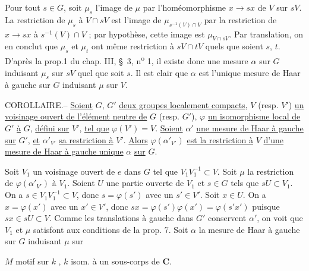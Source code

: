 Pour tout $s\in G$, soit $\mu_s$ l'image de $\mu$ par l'homéomorphisme $x\to sx$ de $V$ sur $sV$. La restriction de $\mu_s$ à $V\cap sV$ est l'image de $\mu_{s^{-1}(V)\cap V}$ par la restriction de $x\to sx$ à $s^{-1}(V)\cap V$ ; par hypothèse, cette image est $\mu_{V\cap sV}$. Par translation, on en conclut que $\mu_s$ et $\mu_t$ ont même restriction à $sV\cap tV$ quels que soient $s$, $t$. D'après la prop.1 du chap. III, \S\ 3, n\textsuperscript{o} 1, il existe donc une mesure $\alpha$ sur $G$ induisant $\mu_s$ sur $sV$ quel que soit $s$. Il est clair que $\alpha$ est l'unique mesure de Haar à gauche sur $G$ induisant $\mu$ sur $V$.

COROLLAIRE.-- \uline{Soient} $G$, $G'$ \uline{deux groupes localement compacts}, $V$ (resp. $V'$) \uline{un voisinage ouvert de l'élément neutre de} $G$ (resp. $G'$), $\varphi$ \uline{un isomorphisme local de} $G'$ \uline{à} $G$, \uline{défini sur} $V'$, \uline{tel que} $\varphi(V')=V$. \uline{Soient} $\alpha'$ \uline{une mesure de Haar à gauche sur} $G'$, \uline{et} $\alpha'_{V'}$ \uline{sa restriction à} $V'$. \uline{Alors} $\varphi(\alpha'_{V'})$ \uline{est la restriction à} $V$ \uline{d'une mesure de Haar à gauche unique} $\alpha$ \uline{sur} $G$.

Soit $V_1$ un voisinage ouvert de $e$ dans $G$ tel que $V_1V_1^{-1}\subset V$. Soit $\mu$ la restriction de $\varphi(\alpha'_{V'})$ à $V_1$. Soient $U$ une partie ouverte de $V_1$ et $s\in G$ tels que $sU\subset V_1$. On a $s\in V_1V_1^{-1}\subset V$, donc $s=\varphi(s')$ avec un $s'\in V'$. Soit $x\in U$. On a $x=\varphi(x')$ avec un $x'\in V'$, donc $sx=\varphi(s')\varphi(x')=\varphi(s'x')$ puisque $sx\in sU\subset V$. Comme les translations à gauche dans $G'$ conservent $\alpha'$, on voit que $V_1$ et $\mu$ satisfont aux conditions de la prop. 7. Soit $\alpha$ la mesure de Haar à gauche sur $G$ induisant $\mu$ sur

$M$ motif sur $k$ , $k$ isom. à un sous-corps de $\mathbf C$.

